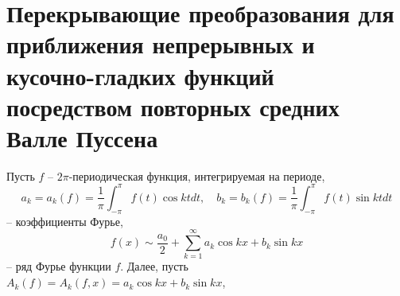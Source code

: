 


\chapter{Перекрывающие преобразования для приближения непрерывных и кусочно-гладких функций посредством повторных средних Валле Пуссена}






Пусть $f$ -- $2\pi$-периодическая функция, интегрируемая на периоде,
\begin{equation*}
    a_k=a_k(f)=\frac1\pi\int_{-\pi}^\pi f(t)\cos ktdt,\quad b_k=b_k(f)=\frac1\pi\int_{-\pi}^\pi f(t)\sin ktdt
\end{equation*}
-- коэффициенты Фурье,
\begin{equation}\label{1.3}
    f(x) \sim \frac{a_0}{2}+ \sum_{k=1}^\infty a_k\cos kx+b_k\sin kx
\end{equation}
-- ряд Фурье функции $f$. Далее, пусть $A_k(f)=A_k(f,x)=a_k\cos kx+b_k\sin kx$,


